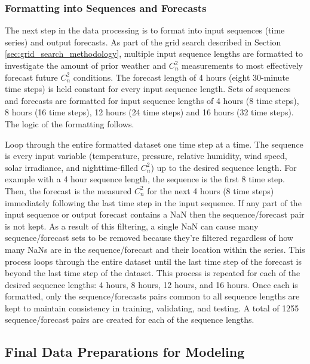 \subsubsection{Formatting into Sequences and Forecasts}
The next step in the data processing is to format into input sequences (time series) and output forecasts. As part of the grid search described in Section \ref{sec:grid_search_methodology}, multiple input sequence lengths are formatted to investigate the amount of prior weather and $C_{n}^{2}$ measurements to most effectively forecast future $C_{n}^{2}$ conditions. The forecast length of 4 hours (eight 30-minute time steps) is held constant for every input sequence length. Sets of sequences and forecasts are formatted for input sequence lengths of 4 hours (8 time steps), 8 hours (16 time steps), 12 hours (24 time steps) and 16 hours (32 time steps). The logic of the formatting follows.

Loop through the entire formatted dataset one time step at a time. The sequence is every input variable (temperature, pressure, relative humidity, wind speed, solar irradiance, and nighttime-filled $C_{n}^{2}$) up to the desired sequence length. For example with a 4 hour sequence length, the sequence is the first 8 time step. Then, the forecast is the measured $C_{n}^{2}$ for the next 4 hours (8 time steps) immediately following the last time step in the input sequence. If any part of the input sequence or output forecast contains a \ac{NaN} then the sequence/forecast pair is not kept. As a result of this filtering, a single \ac{NaN} can cause many sequence/forecast sets to be removed because they're filtered regardless of how many \ac{NaN}s are in the sequence/forecast and their location within the series. This process loops through the entire dataset until the last time step of the forecast is beyond the last time step of the dataset. This process is repeated for each of the desired sequence lengths: 4 hours, 8 hours, 12 hours, and 16 hours. Once each is formatted, only the sequence/forecasts pairs common to all sequence lengths are kept to maintain consistency in training, validating, and testing. A total of 1255 sequence/forecast pairs are created for each of the sequence lengths.

\subsection{Final Data Preparations for Modeling}

